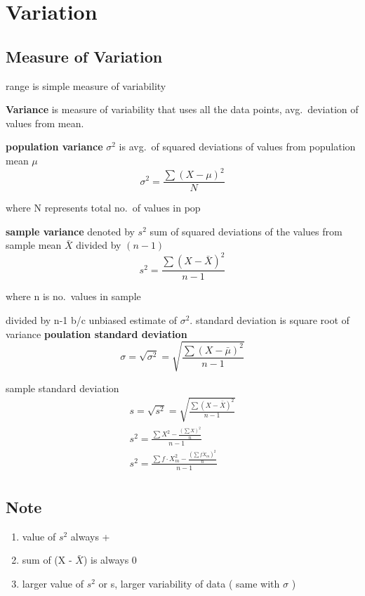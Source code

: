 \documentclass[11pt]{amsart}
\begin{document}
\section{Variation}
\subsection{Measure of Variation}
\par range is simple measure of variability
\par \textbf{Variance} is measure of variability that uses all the data points,
avg.\ deviation of values from mean.
\par \textbf{population variance} $\sigma^2$ is avg.\ of squared deviations of values from population mean $\mu$
\begin{equation}
  \sigma^2 = \frac{\sum{(X-\mu)^2}}{N}
\end{equation}
\par where N represents total no.\ of values in pop
\par \textbf{sample variance} denoted by $s^2$ sum of squared deviations of the values from sample mean $\bar{X}$ divided by $(n-1)$
\begin{equation}
  s^2 = \frac {\sum{(X-\bar{X})^2}}{n-1}
\end{equation}
\par where n is no.\ values in sample
\par divided by n-1  b/c unbiased estimate of $\sigma^2$. standard deviation is square root of variance
\textbf{poulation standard deviation}
\begin{equation}
  \sigma  = \sqrt{\sigma^2} = \sqrt {\frac{\sum{(X-\bar{\mu})^2}}{n-1}}
\end{equation}
\par sample standard deviation
\begin{equation}
  \begin{split}
    s  = \sqrt{s^2} = \sqrt {\frac{\sum{(X-\bar{X})^2}}{n-1}} \\
    s^2 = \frac{\sum{X^2 - \frac{(\sum X)^2}{n}}}{n-1} \\
    s^2 = \frac{\sum{f \cdot X_m^2 - \frac{(\sum f \dot X_m)^2}{n}}}{n-1} \\
  \end{split}
\end{equation}
\subsection{Note}
\begin{enumerate}
  \item value of $s^2$ always +
  \item sum of (X - $\bar{X}$) is always 0
  \item larger value of $s^2$ or s, larger variability of data ( same with $\sigma$ )
\end{enumerate}
\end{document}
